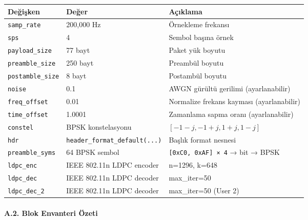 \documentclass[
]{IEEEtran}
\newcounter{none} %
\begin{document}
{\def\LTcaptype{none} %
\begin{longtable}[]{@{}lll@{}}
\toprule\noalign{}
Değişken & Değer & Açıklama \\
\midrule\noalign{}
\endhead
\bottomrule\noalign{}
\endlastfoot
\texttt{samp\_rate} & 200,000 Hz & Örnekleme frekansı \\
\texttt{sps} & 4 & Sembol başına örnek \\
\texttt{payload\_size} & 77 bayt & Paket yük boyutu \\
\texttt{preamble\_size} & 250 bayt & Preambül boyutu \\
\texttt{postamble\_size} & 8 bayt & Postambül boyutu \\
\texttt{noise} & 0.1 & AWGN gürültü gerilimi (ayarlanabilir) \\
\texttt{freq\_offset} & 0.01 & Normalize frekans kayması
(ayarlanabilir) \\
\texttt{time\_offset} & 1.0001 & Zamanlama sapma oranı
(ayarlanabilir) \\
\texttt{constel} & BPSK konstelasyonu & \([-1-j, -1+j, 1+j, 1-j]\) \\
\texttt{hdr} & \texttt{header\_format\_default(...)} & Başlık format
nesnesi \\
\texttt{preamble\_syms} & 64 BPSK sembol &
\texttt{{[}0xC0,\ 0xAF{]}\ ×\ 4} → bit → BPSK \\
\texttt{ldpc\_enc} & IEEE 802.11n LDPC encoder & n=1296, k=648 \\
\texttt{ldpc\_dec} & IEEE 802.11n LDPC decoder & max\_iter=50 \\
\texttt{ldpc\_dec\_2} & IEEE 802.11n LDPC decoder & max\_iter=50 (User
2) \\
\end{longtable}
}

\paragraph{A.2. Blok Envanteri
Özeti}\label{a.2.-blok-envanteri-uxf6zeti}
\end{document}

